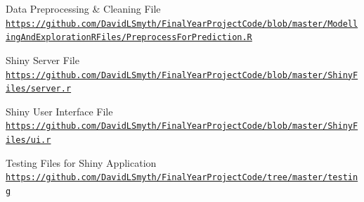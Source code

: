 \documentclass[a4paper, 12pt, twoside]{report}
\begin{document}
\begin{thebibliography}{1}
		Data Preprocessing \& Cleaning File
		\\\texttt{\url{https://github.com/DavidLSmyth/FinalYearProjectCode/blob/master/ModellingAndExplorationRFiles/PreprocessForPrediction.R}}
		
		Shiny Server File
		\\\texttt{\url{https://github.com/DavidLSmyth/FinalYearProjectCode/blob/master/ShinyFiles/server.r}}
		
		Shiny User Interface File
		\\\texttt{\url{https://github.com/DavidLSmyth/FinalYearProjectCode/blob/master/ShinyFiles/ui.r}}
		
		Testing Files for Shiny Application
		\\\texttt{\url{https://github.com/DavidLSmyth/FinalYearProjectCode/tree/master/testing}}
		
		
	\end{thebibliography}
\end{document}
